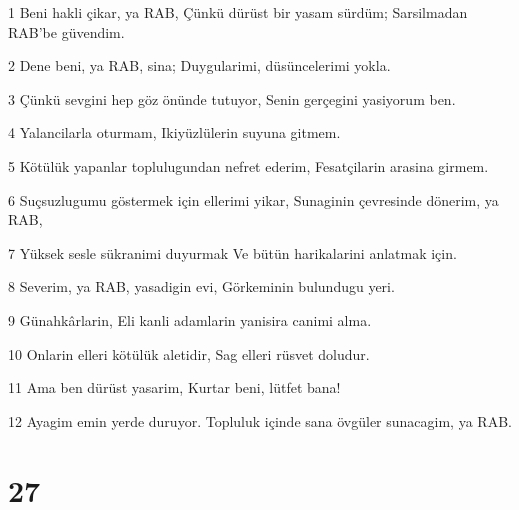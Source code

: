 \par 1 Beni hakli çikar, ya RAB, Çünkü dürüst bir yasam sürdüm; Sarsilmadan RAB'be güvendim.
\par 2 Dene beni, ya RAB, sina; Duygularimi, düsüncelerimi yokla.
\par 3 Çünkü sevgini hep göz önünde tutuyor, Senin gerçegini yasiyorum ben.
\par 4 Yalancilarla oturmam, Ikiyüzlülerin suyuna gitmem.
\par 5 Kötülük yapanlar toplulugundan nefret ederim, Fesatçilarin arasina girmem.
\par 6 Suçsuzlugumu göstermek için ellerimi yikar, Sunaginin çevresinde dönerim, ya RAB,
\par 7 Yüksek sesle sükranimi duyurmak Ve bütün harikalarini anlatmak için.
\par 8 Severim, ya RAB, yasadigin evi, Görkeminin bulundugu yeri.
\par 9 Günahkârlarin, Eli kanli adamlarin yanisira canimi alma.
\par 10 Onlarin elleri kötülük aletidir, Sag elleri rüsvet doludur.
\par 11 Ama ben dürüst yasarim, Kurtar beni, lütfet bana!
\par 12 Ayagim emin yerde duruyor. Topluluk içinde sana övgüler sunacagim, ya RAB.

\chapter{27}

